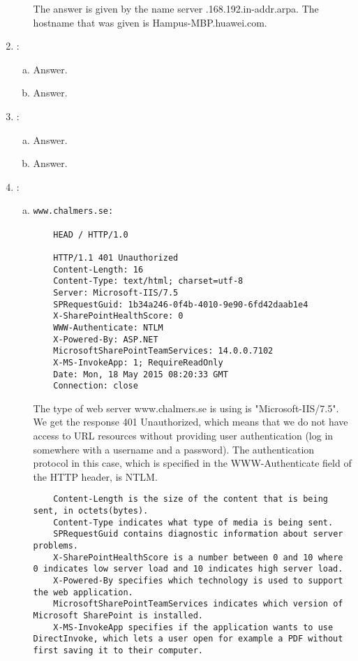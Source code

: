 \documentclass[a4paper,9pt,fleqn]{article}
\begin{document}
\begin{enumerate}[{Task} 1]
\begin{enumerate}[a)]
The answer is given by the name server {.168.192.in-addr.arpa}. The
hostname that was given is {\outp Hampus-MBP.huawei.com}.
\end{enumerate}

\item :
\begin{enumerate}[a)]
\item 
Answer.  
\item 
Answer.
\end{enumerate}

\item :
\begin{enumerate}[a)]
\item 
Answer.  
\item 
Answer.
\end{enumerate}

\item :
\begin{enumerate}[a)]
\item
\begin{lstlisting}
www.chalmers.se:

	HEAD / HTTP/1.0

	HTTP/1.1 401 Unauthorized
	Content-Length: 16
	Content-Type: text/html; charset=utf-8
	Server: Microsoft-IIS/7.5
	SPRequestGuid: 1b34a246-0f4b-4010-9e90-6fd42daab1e4
	X-SharePointHealthScore: 0
	WWW-Authenticate: NTLM
	X-Powered-By: ASP.NET
	MicrosoftSharePointTeamServices: 14.0.0.7102
	X-MS-InvokeApp: 1; RequireReadOnly
	Date: Mon, 18 May 2015 08:20:33 GMT
	Connection: close
\end{lstlisting}	

The type of web server www.chalmers.se is using is "Microsoft-IIS/7.5".
We get the response 401 Unauthorized, which means that we do not have access
to URL resources without providing user authentication (log in somewhere with
a username and a password). The authentication protocol in this case, which
is specified in the WWW-Authenticate field of the HTTP header, is NTLM.

\begin{lstlisting}
	Content-Length is the size of the content that is being sent, in octets(bytes).
	Content-Type indicates what type of media is being sent.
	SPRequestGuid contains diagnostic information about server problems.
	X-SharePointHealthScore is a number between 0 and 10 where 0 indicates low server load and 10 indicates high server load.
	X-Powered-By specifies which technology is used to support the web application.
	MicrosoftSharePointTeamServices indicates which version of Microsoft SharePoint is installed.
	X-MS-InvokeApp specifies if the application wants to use DirectInvoke, which lets a user open for example a PDF without first saving it to their computer. 
\end{lstlisting}


\end{enumerate}
\end{enumerate}
\end{document}
